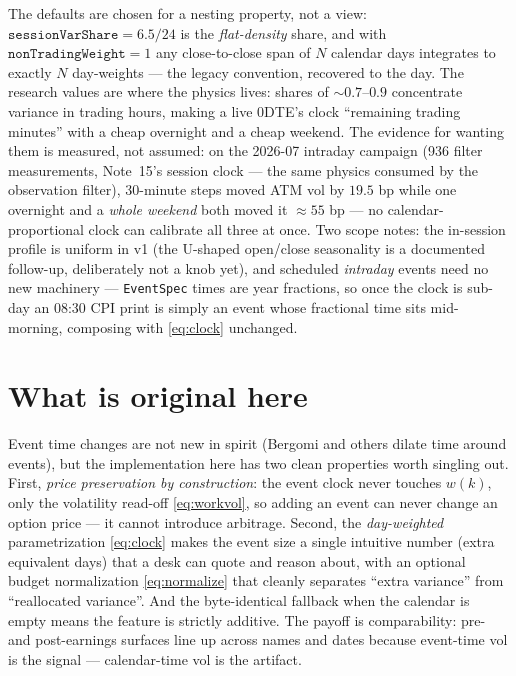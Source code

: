 \documentclass[11pt]{article}
\begin{document}
The defaults are chosen for a nesting property, not a view:
$\texttt{sessionVarShare}=6.5/24$ is the \emph{flat-density} share, and with
$\texttt{nonTradingWeight}=1$ any close-to-close span of $N$ calendar days
integrates to exactly $N$ day-weights --- the legacy convention, recovered
to the day. The research values are where the physics lives: shares of
$\sim0.7$--$0.9$ concentrate variance in trading hours, making a live
0DTE's clock ``remaining trading minutes'' with a cheap overnight and a
cheap weekend. The evidence for wanting them is measured, not assumed: on
the 2026-07 intraday campaign (936 filter measurements, Note~15's session
clock --- the same physics consumed by the observation filter), 30-minute
steps moved ATM vol by $19.5$ bp while one overnight and a \emph{whole
weekend} both moved it $\approx55$ bp --- no calendar-proportional clock
can calibrate all three at once. Two scope notes: the in-session profile is
uniform in v1 (the U-shaped open/close seasonality is a documented
follow-up, deliberately not a knob yet), and scheduled \emph{intraday}
events need no new machinery --- \texttt{EventSpec} times are year
fractions, so once the clock is sub-day an 08:30 CPI print is simply an
event whose fractional time sits mid-morning, composing with
\eqref{eq:clock} unchanged.

\section{What is original here}
\label{sec:original}

Event time changes are not new in spirit (Bergomi and others dilate time around
events), but the implementation here has two clean properties worth singling out.
First, \emph{price preservation by construction}: the event clock never touches
$w(k)$, only the volatility read-off \eqref{eq:workvol}, so adding an event can
never change an option price --- it cannot introduce arbitrage. Second, the
\emph{day-weighted} parametrization \eqref{eq:clock} makes the event size a single
intuitive number (extra equivalent days) that a desk can quote and reason about,
with an optional budget normalization \eqref{eq:normalize} that cleanly separates
``extra variance'' from ``reallocated variance''. And the byte-identical fallback
when the calendar is empty means the feature is strictly additive. The payoff is
comparability: pre- and post-earnings surfaces line up across names and dates
because event-time vol is the signal --- calendar-time vol is the artifact.
\end{document}
